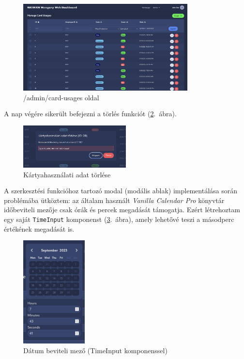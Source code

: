 \documentclass[a4paper]{article}
\newcommand{\inltxt}[1]{\texttt{#1}}
\begin{document}
\begin{figure}[ht]
  \centering
  \includegraphics[width = 0.8\textwidth]{images/manage_card_usages.png}
  \caption{/admin/card-usages oldal}
  \label{fig:admin_card_usages}
\end{figure}

A nap végére sikerült befejezni a törlés funkciót (\ref{fig:delete_card_usage}.~ábra). \\


\begin{figure}[ht]
  \centering
  \includegraphics[clip, trim=40 0 40 0, width=0.5\textwidth]{images/delete_card_usage.png}
  \caption{Kártyahasználati adat törlése}
  \label{fig:delete_card_usage}
\end{figure}


A szerkesztési funkcióhoz tartozó modal
(modális ablak) implementálása során
problémába ütköztem: az általam
használt \emph{Vanilla Calendar Pro} könyvtár időbeviteli mezője csak órák és percek megadását támogatja.
Ezért létrehoztam egy saját \inltxt{TimeInput} komponenst (\ref{fig:time_input}.~ábra), amely lehetővé teszi a másodperc értékének
megadását is.

\begin{figure}[ht]
  \centering
  \includegraphics[width = 0.3\textwidth]{images/time_input.png}
  \caption{Dátum beviteli mező (TimeInput komponenssel)}
  \label{fig:time_input}
\end{figure}
\end{document}
